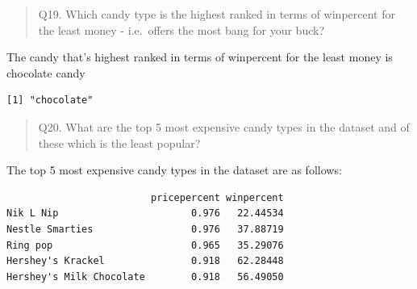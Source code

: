 \documentclass[
  letterpaper,
  DIV=11,
  numbers=noendperiod]{scrartcl}
\newenvironment{Shaded}{\begin{snugshade}}{\end{snugshade}}
\newcommand{\AttributeTok}[1]{\textcolor[rgb]{0.40,0.45,0.13}{#1}}
\newcommand{\ConstantTok}[1]{\textcolor[rgb]{0.56,0.35,0.01}{#1}}
\newcommand{\DecValTok}[1]{\textcolor[rgb]{0.68,0.00,0.00}{#1}}
\newcommand{\FunctionTok}[1]{\textcolor[rgb]{0.28,0.35,0.67}{#1}}
\newcommand{\NormalTok}[1]{\textcolor[rgb]{0.00,0.23,0.31}{#1}}
\newcommand{\OtherTok}[1]{\textcolor[rgb]{0.00,0.23,0.31}{#1}}
\newcommand{\SpecialCharTok}[1]{\textcolor[rgb]{0.37,0.37,0.37}{#1}}
\begin{document}
\begin{quote}
Q19. Which candy type is the highest ranked in terms of winpercent for
the least money - i.e.~offers the most bang for your buck?
\end{quote}

The candy that's highest ranked in terms of winpercent for the least
money is chocolate candy

\begin{Shaded}
\end{Shaded}

\begin{verbatim}
[1] "chocolate"
\end{verbatim}

\begin{quote}
Q20. What are the top 5 most expensive candy types in the dataset and of
these which is the least popular?
\end{quote}

The top 5 most expensive candy types in the dataset are as follows:

\begin{Shaded}
\end{Shaded}

\begin{verbatim}
                         pricepercent winpercent
Nik L Nip                       0.976   22.44534
Nestle Smarties                 0.976   37.88719
Ring pop                        0.965   35.29076
Hershey's Krackel               0.918   62.28448
Hershey's Milk Chocolate        0.918   56.49050
\end{verbatim}
\end{document}

